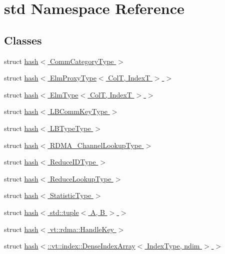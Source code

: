 \hypertarget{namespacestd}{}\section{std Namespace Reference}
\label{namespacestd}
\subsection*{Classes}
\begin{DoxyCompactItemize}
\item 
struct \hyperlink{structstd_1_1hash_3_01_comm_category_type_01_4}{hash$<$ Comm\+Category\+Type $>$}
\item 
struct \hyperlink{structstd_1_1hash_3_01_elm_proxy_type_3_01_col_t_00_01_index_t_01_4_01_4}{hash$<$ Elm\+Proxy\+Type$<$ Col\+T, Index\+T $>$ $>$}
\item 
struct \hyperlink{structstd_1_1hash_3_01_elm_type_3_01_col_t_00_01_index_t_01_4_01_4}{hash$<$ Elm\+Type$<$ Col\+T, Index\+T $>$ $>$}
\item 
struct \hyperlink{structstd_1_1hash_3_01_l_b_comm_key_type_01_4}{hash$<$ L\+B\+Comm\+Key\+Type $>$}
\item 
struct \hyperlink{structstd_1_1hash_3_01_l_b_type_type_01_4}{hash$<$ L\+B\+Type\+Type $>$}
\item 
struct \hyperlink{structstd_1_1hash_3_01_r_d_m_a___channel_lookup_type_01_4}{hash$<$ R\+D\+M\+A\+\_\+\+Channel\+Lookup\+Type $>$}
\item 
struct \hyperlink{structstd_1_1hash_3_01_reduce_i_d_type_01_4}{hash$<$ Reduce\+I\+D\+Type $>$}
\item 
struct \hyperlink{structstd_1_1hash_3_01_reduce_lookup_type_01_4}{hash$<$ Reduce\+Lookup\+Type $>$}
\item 
struct \hyperlink{structstd_1_1hash_3_01_statistic_type_01_4}{hash$<$ Statistic\+Type $>$}
\item 
struct \hyperlink{structstd_1_1hash_3_01std_1_1tuple_3_01_a_00_01_b_01_4_01_4}{hash$<$ std\+::tuple$<$ A, B $>$ $>$}
\item 
struct \hyperlink{structstd_1_1hash_3_01vt_1_1rdma_1_1_handle_key_01_4}{hash$<$ vt\+::rdma\+::\+Handle\+Key $>$}
\item 
struct \hyperlink{structstd_1_1hash_3_1_1vt_1_1index_1_1_dense_index_array_3_01_index_type_00_01ndim_01_4_01_4}{hash$<$\+::vt\+::index\+::\+Dense\+Index\+Array$<$ Index\+Type, ndim $>$ $>$}
\end{DoxyCompactItemize}
